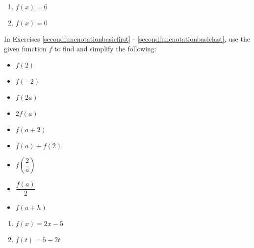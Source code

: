 \begin{multicols}{2}
\begin{enumerate}
\setcounter{enumi}{\value{HW}}

\item $f(x) = 6$
\item $f(x) = 0$ \label{funcnotationbasiclast}

\setcounter{HW}{\value{enumi}}
\end{enumerate}
\end{multicols}

In Exercises \ref{secondfuncnotationbasicfirst} - \ref{secondfuncnotationbasiclast}, use the given function $f$ to find and simplify the following:

\begin{multicols}{3}
\begin{itemize}

\item  $f(2)$
\item  $f(-2)$
\item  $f(2a)$

\end{itemize}
\end{multicols}

\begin{multicols}{3}
\begin{itemize}

\item  $2 f(a)$
\item $f(a+2)$
\item $f(a) + f(2)$

\end{itemize}
\end{multicols}

\begin{multicols}{3}
\begin{itemize}

\item  $f \left( \dfrac{2}{a} \right)$
\item $\dfrac{f(a)}{2}$
\item  $f(a + h)$

\end{itemize}
\end{multicols}


\begin{multicols}{2}
\begin{enumerate}
\setcounter{enumi}{\value{HW}}

\item $f(x) = 2x-5$ \label{secondfuncnotationbasicfirst}
\item $f(t) = 5-2t$

\setcounter{HW}{\value{enumi}}
\end{enumerate}
\end{multicols}

